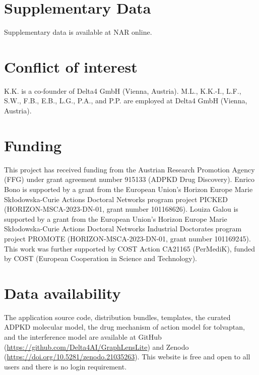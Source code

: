 \section{Supplementary Data}
Supplementary data is available at NAR online.

\section{Conflict of interest}
K.K. is a co-founder of Delta4 GmbH (Vienna, Austria). M.L., K.K.-I., L.F., S.W., F.B., E.B., L.G., P.A., and P.P. are employed at Delta4 GmbH (Vienna, Austria).

\section{Funding}
This project has received funding from the Austrian Research Promotion Agency (FFG) under grant agreement number 915133 (ADPKD Drug Discovery). Enrico Bono is supported by a grant from the European Union's Horizon Europe Marie Skłodowska-Curie Actions Doctoral Networks program project PICKED (HORIZON-MSCA-2023-DN-01, grant number 101168626). Louiza Galou is supported by a grant from the European Union's Horizon Europe Marie Skłodowska-Curie Actions Doctoral Networks Industrial Doctorates program project PROMOTE (HORIZON-MSCA-2023-DN-01, grant number 101169245). This work was further supported by COST Action CA21165 (PerMediK), funded by COST (European Cooperation in Science and Technology).

\section{Data availability}
The application source code, distribution bundles, templates, the curated ADPKD molecular model, the drug mechanism of action model for tolvaptan, and the interference model are available at GitHub (\url{https://github.com/Delta4AI/GraphLensLite}) and Zenodo (\url{https://doi.org/10.5281/zenodo.21035263}). This website is free and open to all users and there is no login requirement.
